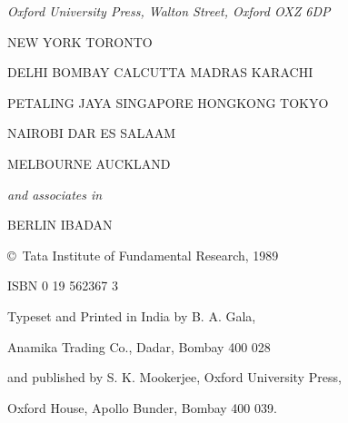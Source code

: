 \begin{center}
{\em Oxford University Press, Walton Street, Oxford OXZ 6DP}
\medskip

NEW YORK TORONTO

DELHI BOMBAY CALCUTTA MADRAS KARACHI

PETALING JAYA SINGAPORE HONGKONG TOKYO

NAIROBI DAR ES SALAAM

MELBOURNE AUCKLAND

\medskip

\textit{and associates in }

BERLIN IBADAN

\bigskip

\vskip 1cm

\copyright\ Tata Institute of Fundamental Research, 1989

\bigskip

\bigskip
ISBN 0 19 562367 3

\vfill


\medskip
Typeset and Printed in India by B. A. Gala,

Anamika Trading Co., Dadar, Bombay 400 028

and published by S. K. Mookerjee, Oxford University Press, 

Oxford House, Apollo Bunder, Bombay 400 039.
\end{center}

\eject
